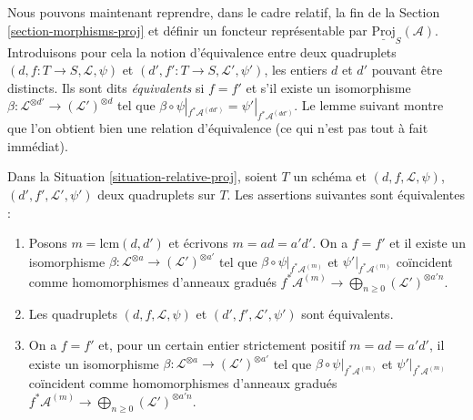 \noindent
Nous pouvons maintenant reprendre, dans le cadre relatif, la fin de la
Section \ref{section-morphisms-proj} et définir un foncteur représentable
par $\underline{\text{Proj}}_S(\mathcal{A})$.
Introduisons pour cela la notion d'équivalence entre deux quadruplets
$(d, f : T \to S, \mathcal{L}, \psi)$ et
$(d', f' : T \to S, \mathcal{L}', \psi')$, les entiers $d$ et $d'$
pouvant être distincts. Ils sont dits {\it équivalents} si $f = f'$ et
s'il existe un isomorphisme
$\beta : \mathcal{L}^{\otimes d'} \to (\mathcal{L}')^{\otimes d}$ tel que
$\beta \circ \psi|_{f^*\mathcal{A}^{(dd')}} = \psi'|_{f^*\mathcal{A}^{(dd')}}$.
Le lemme suivant montre que l'on obtient bien une relation d'équivalence
(ce qui n'est pas tout à fait immédiat).

\begin{lemma}
\label{lemma-equivalent-relative}
Dans la Situation \ref{situation-relative-proj}, soient $T$ un schéma et
$(d, f, \mathcal{L}, \psi)$, $(d', f', \mathcal{L}', \psi')$ deux
quadruplets sur $T$. Les assertions suivantes sont équivalentes :
\begin{enumerate}
\item Posons $m = \text{lcm}(d, d')$ et écrivons $m = ad = a'd'$.
On a $f = f'$ et il existe un isomorphisme
$\beta : \mathcal{L}^{\otimes a} \to (\mathcal{L}')^{\otimes a'}$
tel que $\beta \circ \psi|_{f^*\mathcal{A}^{(m)}}$ et
$\psi'|_{f^*\mathcal{A}^{(m)}}$ coïncident comme homomorphismes d'anneaux
gradués
$f^*\mathcal{A}^{(m)} \to \bigoplus_{n \geq 0} (\mathcal{L}')^{\otimes a'n}$.
\item Les quadruplets $(d, f, \mathcal{L}, \psi)$ et
$(d', f', \mathcal{L}', \psi')$ sont équivalents.
\item On a $f = f'$ et, pour un certain entier strictement positif
$m = ad = a'd'$, il existe un isomorphisme
$\beta : \mathcal{L}^{\otimes a} \to (\mathcal{L}')^{\otimes a'}$
tel que $\beta \circ \psi|_{f^*\mathcal{A}^{(m)}}$ et
$\psi'|_{f^*\mathcal{A}^{(m)}}$ coïncident comme homomorphismes d'anneaux
gradués
$f^*\mathcal{A}^{(m)} \to \bigoplus_{n \geq 0} (\mathcal{L}')^{\otimes a'n}$.
\end{enumerate}
\end{lemma}

